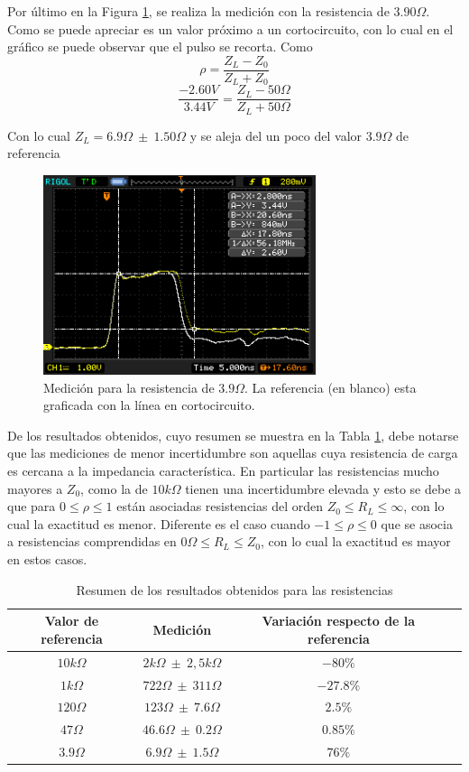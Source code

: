 \documentclass[a4paper,10pt]{article}
\begin{document}
	\indent Por \'ultimo en la Figura \ref{img005}, se realiza la medici\'on 
	con la resistencia de $3.90\Omega$. Como se puede apreciar es un valor 
	pr\'oximo a un cortocircuito, con lo cual en el gr\'afico se puede 
	observar que el pulso se recorta. Como $$\rho=\frac{Z_L-Z_0}{Z_L+Z_0}$$
	$$\frac{-2.60V}{3.44V}=\frac{Z_L- 50\Omega}{Z_L+50\Omega}$$
	
	\indent Con lo cual $Z_L=6.9\Omega~\pm~1.50\Omega$ y se aleja del un poco del valor 
	$3.9\Omega$ de referencia
		
		\begin{figure}[!htb]
			\centering
			\includegraphics[width=8cm]
			{Imagenes/Res3e9.png}
			\caption{Medici\'on para la resistencia de $3.9\Omega$. La 
			referencia (en blanco) esta graficada con la l\'inea en 
			cortocircuito.}
			\label{img005}
		\end{figure}

	\indent De los resultados obtenidos, cuyo resumen se muestra en la Tabla 
	\ref{tab001}, debe notarse que las mediciones de menor incertidumbre son 
	aquellas cuya resistencia de carga es cercana a la impedancia 
	caracter\'istica. En particular las resistencias mucho mayores a $Z_0$, como
	la de $10k\Omega$ tienen una incertidumbre elevada y esto se debe a que para
	$0\leq \rho \leq 1$ est\'an asociadas resistencias del orden 
	$Z_0 \leq R_L \leq \infty$, con lo cual la exactitud es menor. Diferente es el caso cuando $-1\leq \rho \leq 0$ que se asocia a resistencias comprendidas en $0\Omega \leq R_L \leq Z_0$, con lo cual la exactitud es mayor en estos casos.

	
		\begin{table}[!htp]
			\centering
			\begin{tabular}{|c|c|c|c|}
				\hline
    			Valor de referencia & Medici\'on & Variaci\'on respecto de la referencia \\
				\hline
				$10k\Omega$ & $2k\Omega~\pm~2,5k\Omega$ &$-80 \% $ \\
				\hline 
				$1k\Omega$ & $722\Omega~\pm~311\Omega$ &$-27.8\%$\\
				\hline
				$120\Omega$ & $123\Omega~\pm~7.6\Omega$ &$2.5\% $ \\
				\hline
				$47\Omega$ & $46.6\Omega~\pm~0.2\Omega$ &$0.85\% $ \\
				\hline
				$3.9\Omega$ & $6.9\Omega~\pm~1.5\Omega$ &$76\% $  \\
				\hline								
			\end{tabular}
			\caption{Resumen de los resultados obtenidos para las resistencias
			} 
			\label{tab001}
		\end{table}
		
\end{document}

